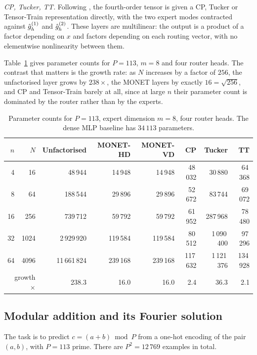\emph{CP, Tucker, TT.} Following \citet{oldfield2024mumoe}, the fourth-order
tensor is given a CP, Tucker or Tensor-Train representation directly, with the
two expert modes contracted against $\hat{g}^{(1)}_h$ and $\hat{g}^{(2)}_h$. These
layers are multilinear: the output is a product of a factor depending on $x$
and factors depending on each routing vector, with no elementwise
nonlinearity between them.

Table~\ref{tab:params} gives parameter counts for $P = 113$, $m = 8$ and four
router heads. The contrast that matters is the growth rate: as $N$ increases
by a factor of $256$, the unfactorised layer grows by $238\times$, the MONET
layers by exactly $16 = \sqrt{256}$, and CP and Tensor-Train barely at all,
since at large $n$ their parameter count is dominated by the router rather
than by the experts.

\begin{table}[t]
\centering
\caption{Parameter counts for $P=113$, expert dimension $m=8$, four router
heads. The dense MLP baseline has $34\,113$ parameters.}
\label{tab:params}
\begin{tabular}{rrrrrrrr}
\toprule
$n$ & $N$ & Unfactorised & MONET-HD & MONET-VD & CP & Tucker & TT \\
\midrule
 4 &   16 &      48\,944 &  14\,948 &  14\,948 & 48\,032 &    30\,880 & 64\,368 \\
 8 &   64 &     188\,544 &  29\,896 &  29\,896 & 52\,672 &    83\,744 & 69\,072 \\
16 &  256 &     739\,712 &  59\,792 &  59\,792 & 61\,952 &   287\,968 & 78\,480 \\
32 & 1024 &  2\,929\,920 & 119\,584 & 119\,584 & 80\,512 & 1\,090\,400 & 97\,296 \\
64 & 4096 & 11\,661\,824 & 239\,168 & 239\,168 & 117\,632 & 1\,121\,376 & 134\,928 \\
\midrule
\multicolumn{2}{r}{growth $\times$} & 238.3 & 16.0 & 16.0 & 2.4 & 36.3 & 2.1 \\
\bottomrule
\end{tabular}
\end{table}

\subsection{Modular addition and its Fourier solution}

The task is to predict $c = (a+b) \bmod P$ from a one-hot encoding of the pair
$(a,b)$, with $P = 113$ prime. There are $P^2 = 12\,769$ examples in total.

